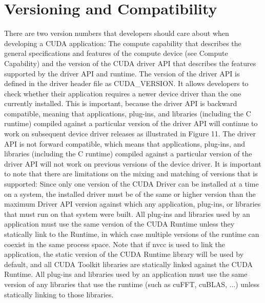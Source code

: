 \documentclass[openany]{book}
\begin{document}
\section{Versioning and Compatibility}%
There are two version numbers that developers should care about when developing a CUDA application: The compute capability that describes the general specifications and features of the compute device (see Compute Capability) and the version of the CUDA driver API that describes the features supported by the driver API and runtime.
The version of the driver API is defined in the driver header file as CUDA\_VERSION. It allows developers to check whether their application requires a newer device driver than the one currently installed. This is important, because the driver API is backward compatible, meaning that applications, plug-ins, and libraries (including the C runtime) compiled against a particular version of the driver API will continue to work on subsequent device driver releases as illustrated in Figure 11. The driver API is not forward compatible, which means that applications, plug-ins, and libraries (including the C runtime) compiled against a particular version of the driver API will not work on previous versions of the device driver.
It is important to note that there are limitations on the mixing and matching of versions that is supported:
Since only one version of the CUDA Driver can be installed at a time on a system, the installed driver must be of the same or higher version than the maximum Driver API version against which any application, plug-ins, or libraries that must run on that system were built.
All plug-ins and libraries used by an application must use the same version of the CUDA Runtime unless they statically link to the Runtime, in which case multiple versions of the runtime can coexist in the same process space. Note that if nvcc is used to link the application, the static version of the CUDA Runtime library will be used by default, and all CUDA Toolkit libraries are statically linked against the CUDA Runtime.
All plug-ins and libraries used by an application must use the same version of any libraries that use the runtime (such as cuFFT, cuBLAS, ...) unless statically linking to those libraries.
\end{document}
